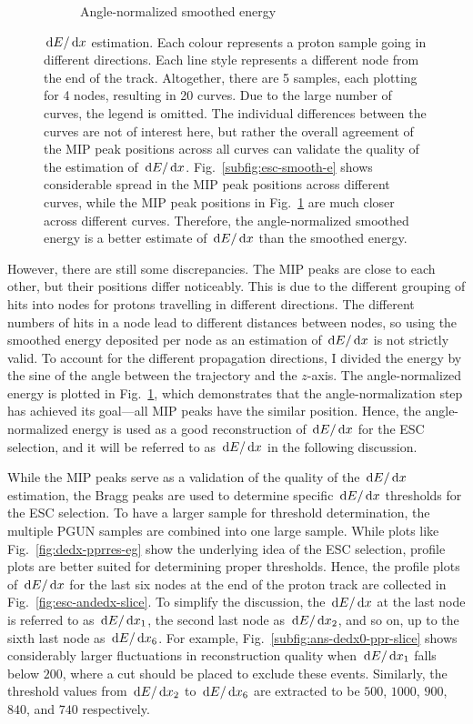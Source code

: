 \begin{figure}[htb]
\begin{subfigure}{\dbfigwid\textwidth}
             \caption{Angle-normalized smoothed energy}
             \label{subfig:esc-an-smooth-e}
        \end{subfigure}
        \caption{$\,\textrm{d}E/\,\textrm{d}x$ estimation. Each colour represents a proton sample going in different directions. Each line style represents a different node from the end of the track. Altogether, there are 5 samples, each plotting for 4 nodes, resulting in 20 curves. Due to the large number of curves, the legend is omitted. The individual differences between the curves are not of interest here, but rather the overall agreement of the MIP peak positions across all curves can validate the quality of the estimation of $\,\textrm{d}E/\,\textrm{d}x$. Fig.~\ref{subfig:esc-smooth-e} shows considerable spread in the MIP peak positions across different curves, while the MIP peak positions in Fig.~\ref{subfig:esc-an-smooth-e} are much closer across different curves. Therefore, the angle-normalized smoothed energy is a better estimate of $\,\textrm{d}E/\,\textrm{d}x$ than the smoothed energy.}
        \label{fig:esc-angnorm}
     \end{figure}
     However, there are still some discrepancies.
     The MIP peaks are close to each other, but their positions differ noticeably.
     This is due to the different grouping of hits into nodes for protons travelling in different directions.
     The different numbers of hits in a node lead to different distances between nodes, so using the smoothed energy deposited per node as an estimation of $\,\textrm{d}E/\,\textrm{d}x$ is not strictly valid.
     To account for the different propagation directions, I divided the energy by the sine of the angle between the trajectory and the $z$-axis.
     The angle-normalized energy is plotted in Fig.~\ref{subfig:esc-an-smooth-e}, which demonstrates that the angle-normalization step has achieved its goal—all MIP peaks have the similar position.
     Hence, the angle-normalized energy is used as a good reconstruction of $\,\textrm{d}E/\,\textrm{d}x$ for the ESC selection, and it will be referred to as $\,\textrm{d}E/\,\textrm{d}x$ in the following discussion.

     While the MIP peaks serve as a validation of the quality of the $\,\textrm{d}E/\,\textrm{d}x$ estimation, the Bragg peaks are used to determine specific $\,\textrm{d}E/\,\textrm{d}x$ thresholds for the ESC selection.
     To have a larger sample for threshold determination, the multiple PGUN samples are combined into one large sample.
     While plots like Fig.~\ref{fig:dedx-pprres-eg} show the underlying idea of the ESC selection, profile plots are better suited for determining proper thresholds.
     Hence, the profile plots of $\,\textrm{d}E/\,\textrm{d}x$ for the last six nodes at the end of the proton track are collected in Fig.~\ref{fig:esc-andedx-slice}.
     To simplify the discussion, the $\,\textrm{d}E/\,\textrm{d}x$ at the last node is referred to as $\,\textrm{d}E/\,\textrm{d}x_1$, the second last node as $\,\textrm{d}E/\,\textrm{d}x_2$, and so on, up to the sixth last node as $\,\textrm{d}E/\,\textrm{d}x_6$.
     For example, Fig.~\ref{subfig:ans-dedx0-ppr-slice} shows considerably larger fluctuations in reconstruction quality when $\,\textrm{d}E/\,\textrm{d}x_1$ falls below $200$, where a cut should be placed to exclude these events.
     Similarly, the threshold values from $\,\textrm{d}E/\,\textrm{d}x_2$ to $\,\textrm{d}E/\,\textrm{d}x_6$ are extracted to be $500$, $1000$, $900$, $840$, and $740$ respectively.

